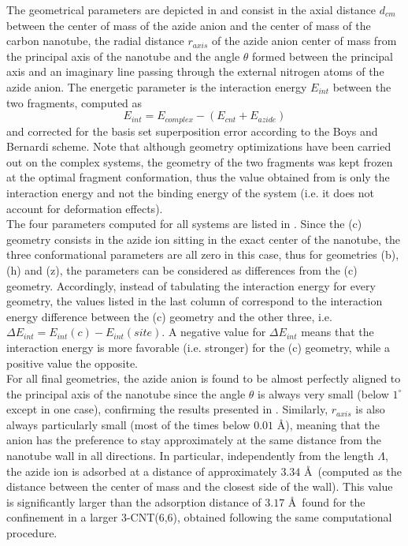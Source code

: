 \documentclass[utf8]{article}
\begin{document}
The geometrical parameters are depicted in  and consist in the axial distance $d_{cm}$ between the center of mass of the azide anion and the center of mass of the carbon nanotube, the radial distance $r_{axis}$ of the azide anion center of mass from the principal axis of the nanotube and the angle $\theta$ formed between the principal axis and an imaginary line passing through the external nitrogen atoms of the azide anion.
The energetic parameter is the interaction energy $E_{int}$ between the two fragments, computed as
%
\begin{equation}
    E_{int} = E_{complex} - (E_{cnt} + E_{azide})
    \label{eq:eint}
\end{equation}
%
and corrected for the basis set superposition error according to the Boys and Bernardi scheme\cite{Boys1970}.
Note that although geometry optimizations have been carried out on the complex systems, the geometry of the two fragments was kept frozen at the optimal fragment conformation, thus the value obtained from  is only the interaction energy and not the binding energy of the system (i.e. it does not account for deformation effects).\\
The four parameters computed for all systems are listed in . Since the (c) geometry consists in the azide ion sitting in the exact center of the nanotube, the three conformational parameters are all zero in this case, thus for geometries (b), (h) and (z), the parameters can be considered as differences from the (c) geometry. Accordingly, instead of tabulating the interaction energy for every geometry, the values listed in the last column of  correspond to the interaction energy difference between the (c) geometry and the other three, i.e. $\Delta E_{int} = E_{int}(c) - E_{int}(site)$. A negative value for $\Delta E_{int}$ means that the interaction energy is more favorable (i.e. stronger) for the (c) geometry, while a positive value the opposite.\\
For all final geometries, the azide anion is found to be almost perfectly aligned to the principal axis of the nanotube since the angle $\theta$ is always very small (below $1^{\circ}$ except in one case), confirming the results presented in \cite{Battaglia2017a}.
Similarly, $r_{axis}$ is also always particularly small (most of the times below $0.01$ \AA), meaning that the anion has the preference to stay approximately at the same distance from the nanotube wall in all directions.
In particular, independently from the length $\Lambda$, the azide ion is adsorbed at a distance of approximately $3.34$ \AA\ (computed as the distance between the \ntm center of mass and the closest side of the wall). This value is significantly larger than the adsorption distance of $3.17$ \AA\ found for the confinement in a larger 3-CNT(6,6), obtained following the same computational procedure.
\end{document}
